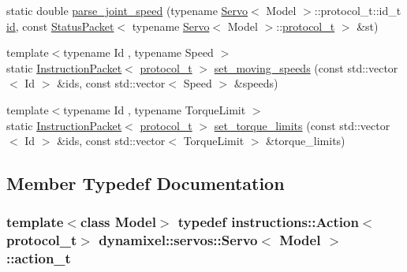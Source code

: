 \begin{DoxyCompactItemize}
static double \hyperlink{classdynamixel_1_1servos_1_1_servo_a4eeab8a43893c98df9f3cad6cdf2a6ab}{parse\+\_\+joint\+\_\+speed} (typename \hyperlink{classdynamixel_1_1servos_1_1_servo}{Servo}$<$ Model $>$\+::protocol\+\_\+t\+::id\+\_\+t \hyperlink{classdynamixel_1_1servos_1_1_servo_a2d022081672e25a7bb57b76706e1cc57}{id}, const \hyperlink{classdynamixel_1_1_status_packet}{Status\+Packet}$<$ typename \hyperlink{classdynamixel_1_1servos_1_1_servo}{Servo}$<$ Model $>$\+::\hyperlink{classdynamixel_1_1servos_1_1_servo_a7718c41cee1187b992836f4b6bad8a38}{protocol\+\_\+t} $>$ \&st)
\item 
{\footnotesize template$<$typename Id , typename Speed $>$ }\\static \hyperlink{classdynamixel_1_1_instruction_packet}{Instruction\+Packet}$<$ \hyperlink{classdynamixel_1_1servos_1_1_servo_a7718c41cee1187b992836f4b6bad8a38}{protocol\+\_\+t} $>$ \hyperlink{classdynamixel_1_1servos_1_1_servo_a8e764c4e4bdeaf3cc89b3fb7955db62c}{set\+\_\+moving\+\_\+speeds} (const std\+::vector$<$ Id $>$ \&ids, const std\+::vector$<$ Speed $>$ \&speeds)
\item 
{\footnotesize template$<$typename Id , typename Torque\+Limit $>$ }\\static \hyperlink{classdynamixel_1_1_instruction_packet}{Instruction\+Packet}$<$ \hyperlink{classdynamixel_1_1servos_1_1_servo_a7718c41cee1187b992836f4b6bad8a38}{protocol\+\_\+t} $>$ \hyperlink{classdynamixel_1_1servos_1_1_servo_ab10774b1d3d5532f19df4d535d33e369}{set\+\_\+torque\+\_\+limits} (const std\+::vector$<$ Id $>$ \&ids, const std\+::vector$<$ Torque\+Limit $>$ \&torque\+\_\+limits)
\end{DoxyCompactItemize}


\subsection{Member Typedef Documentation}
\hypertarget{classdynamixel_1_1servos_1_1_servo_ad4d14ab8f1ea33479dce5fc2c7790ded}{}
\subsubsection[{action\+\_\+t}]{\setlength{\rightskip}{0pt plus 5cm}template$<$class Model$>$ typedef {\bf instructions\+::\+Action}$<${\bf protocol\+\_\+t}$>$ {\bf dynamixel\+::servos\+::\+Servo}$<$ Model $>$\+::{\bf action\+\_\+t}}\label{classdynamixel_1_1servos_1_1_servo_ad4d14ab8f1ea33479dce5fc2c7790ded}
\hypertarget{classdynamixel_1_1servos_1_1_servo_a882738edc68b4e641e066954f59896d3}{}
